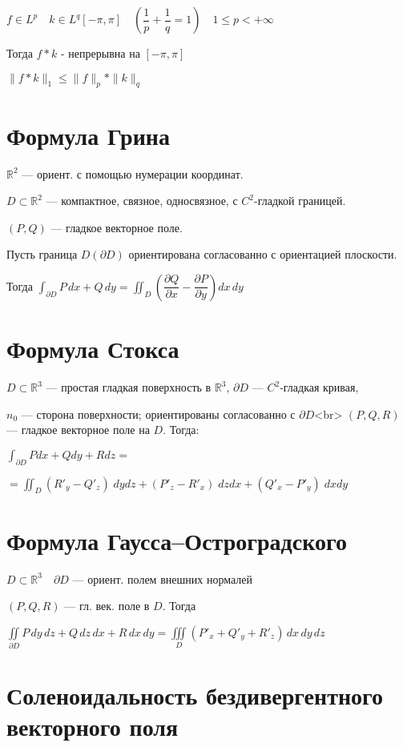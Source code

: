 \documentclass[paper=a4, fontsize=17pt]{article}
\begin{document}
$f \in L^p \quad k \in L^q[-\pi, \pi] \quad \left(\dfrac{1}{p} + \dfrac{1}{q} = 1 \right) \quad 1 \leqslant p < +\infty$

Тогда $f * k$ - непрерывна на $[-\pi, \pi]$

$\|f * k \|_1 \leqslant \|f\|_p * \|k\|_q$

\section{Формула Грина}

$\mathbb R^2$ — ориент. с помощью нумерации координат.

$D \subset \mathbb R^2$ — компактное, связное, односвязное, с $C^2$-гладкой границей.

$(P, Q)$ — гладкое векторное поле.

Пусть граница $D (\partial D)$ ориентирована согласованно с ориентацией плоскости.

Тогда $\displaystyle\int_{\partial D} P \,dx + Q \,dy = \displaystyle\iint_D \left(\dfrac{\partial Q}{\partial x} - \dfrac{\partial P}{\partial y}\right) dx\, dy$

\section{Формула Стокса}

$D \subset \mathbb R^3$ — простая гладкая поверхность в $\mathbb R^3$,
$\partial D$ — $C^2$-гладкая кривая,

$n_0$ — сторона поверхности; ориентированы согласованно с $\partial D$<br>
$(P,Q,R)$ — гладкое векторное поле на $D$. Тогда:

$\displaystyle\int_{\partial D} P dx + Q dy + R dz =$

$= \displaystyle\iint_D (R'_y - Q'_z) \;dy dz + (P'_z - R'_x) \;dz dx + (Q'_x - P'_y) \;dx dy$

\section{Формула Гаусса--Остроградского}

$D \subset \mathbb R^3 \quad \partial D$ — ориент. полем внешних нормалей

$(P, Q, R)$ — гл. век. поле в $D$. Тогда


 $\displaystyle\iint\limits_{\partial D} P \,dy\,dz + Q \,dz\,dx + R \,dx\,dy = \iiint\limits_D (P'_x + Q'_y + R'_z)\,dx\,dy\,dz$

\section{Соленоидальность бездивергентного векторного поля}
\end{document}
